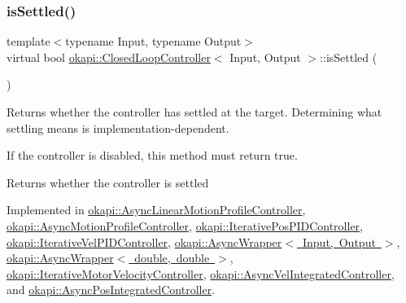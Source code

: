 \mbox{\label{classokapi_1_1ClosedLoopController_aed7aa0e94b6474c28314f8517d6cb4d8}} 
\subsubsection{\texorpdfstring{isSettled()}{isSettled()}}
{\footnotesize\ttfamily template$<$typename Input, typename Output$>$ \\
virtual bool \mbox{\hyperlink{classokapi_1_1ClosedLoopController}{okapi\+::\+Closed\+Loop\+Controller}}$<$ Input, Output $>$\+::is\+Settled (\begin{DoxyParamCaption}{ }\end{DoxyParamCaption})\hspace{0.3cm}{\ttfamily [pure virtual]}}

Returns whether the controller has settled at the target. Determining what settling means is implementation-\/dependent.

If the controller is disabled, this method must return true.

\begin{DoxyReturn}{Returns}
whether the controller is settled 
\end{DoxyReturn}


Implemented in \mbox{\hyperlink{classokapi_1_1AsyncLinearMotionProfileController_aecfed2c6a0ead2c38253250e26ce17d4}{okapi\+::\+Async\+Linear\+Motion\+Profile\+Controller}}, \mbox{\hyperlink{classokapi_1_1AsyncMotionProfileController_abfc944ba6d703dc1aa6fb16a44b5e395}{okapi\+::\+Async\+Motion\+Profile\+Controller}}, \mbox{\hyperlink{classokapi_1_1IterativePosPIDController_a856b633717128607fa8f1b52d91f89d6}{okapi\+::\+Iterative\+Pos\+P\+I\+D\+Controller}}, \mbox{\hyperlink{classokapi_1_1IterativeVelPIDController_a818347e199d8e7fd3e11f9f1aa369749}{okapi\+::\+Iterative\+Vel\+P\+I\+D\+Controller}}, \mbox{\hyperlink{classokapi_1_1AsyncWrapper_a93343937a8bbe762aeb6460197a22dfe}{okapi\+::\+Async\+Wrapper$<$ Input, Output $>$}}, \mbox{\hyperlink{classokapi_1_1AsyncWrapper_a93343937a8bbe762aeb6460197a22dfe}{okapi\+::\+Async\+Wrapper$<$ double, double $>$}}, \mbox{\hyperlink{classokapi_1_1IterativeMotorVelocityController_ade18c38b1ec3196b25b0ea323d8e1075}{okapi\+::\+Iterative\+Motor\+Velocity\+Controller}}, \mbox{\hyperlink{classokapi_1_1AsyncVelIntegratedController_a8518d706827ccc8d42d0a401566d58f7}{okapi\+::\+Async\+Vel\+Integrated\+Controller}}, and \mbox{\hyperlink{classokapi_1_1AsyncPosIntegratedController_a21b7ee29d335ee33aed1c41969a27f62}{okapi\+::\+Async\+Pos\+Integrated\+Controller}}.

